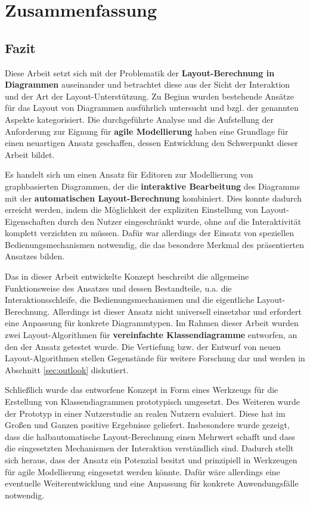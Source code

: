 
\chapter{Zusammenfassung}
\label{chapter:summary}

\section{Fazit}

Diese Arbeit setzt sich mit der Problematik der \textbf{Layout-Berechnung in Diagrammen} auseinander und betrachtet diese aus der Sicht der Interaktion und der Art der Layout-Unterstützung. Zu Beginn wurden bestehende Ansätze für das Layout von Diagrammen ausführlich untersucht und bzgl. der genannten Aspekte kategorisiert. Die durchgeführte Analyse und die Aufstellung der Anforderung zur Eignung für \textbf{agile Modellierung} haben eine Grundlage für einen neuartigen Ansatz geschaffen, dessen Entwicklung den Schwerpunkt dieser Arbeit bildet.

Es handelt sich um einen Ansatz für Editoren zur Modellierung von graphbasierten Diagrammen, der die \textbf{interaktive Bearbeitung} des Diagramms mit der \textbf{automatischen Layout-Be\-rech\-nung} kombiniert. Dies konnte dadurch erreicht werden, indem die Möglichkeit der expliziten Einstellung von Layout-Eigenschaften durch den Nutzer eingeschränkt wurde, ohne auf die Interaktivität komplett verzichten zu müssen. Dafür war allerdings der Einsatz von speziellen Bedienungsmechanismen notwendig, die das besondere Merkmal des präsentierten Ansatzes bilden.

Das in dieser Arbeit entwickelte Konzept beschreibt die allgemeine Funktionsweise des Ansatzes und dessen Bestandteile, u.a. die Interaktionsschleife, die Bedienungsmechanismen und die eigentliche Layout-Berechnung. Allerdings ist dieser Ansatz nicht universell einsetzbar und erfordert eine Anpassung für konkrete Diagrammtypen. Im Rahmen dieser Arbeit wurden zwei Layout-Algorithmen für \textbf{vereinfachte Klassendiagramme} entworfen, an den der Ansatz getestet wurde. Die Vertiefung bzw. der Entwurf von neuen Layout-Algorithmen stellen Gegenstände für weitere Forschung dar und werden in Abschnitt \ref{sec:outlook} diskutiert.

Schließlich wurde das entworfene Konzept in Form eines Werkzeugs für die Erstellung von Klassendiagrammen prototypisch umgesetzt. Des Weiteren wurde der Prototyp in einer Nutzerstudie an realen Nutzern evaluiert. Diese hat im Großen und Ganzen positive Ergebnisse geliefert. Insbesondere wurde gezeigt, dass die halbautomatische Layout-Berechnung einen Mehrwert schafft und dass die eingesetzten Mechanismen der Interaktion verständlich sind. Dadurch stellt sich heraus, dass der Ansatz ein Potenzial besitzt und prinzipiell in Werkzeugen für agile Modellierung eingesetzt werden könnte. Dafür wäre allerdings eine eventuelle Weiterentwicklung und eine Anpassung für konkrete Anwendungsfälle notwendig.

